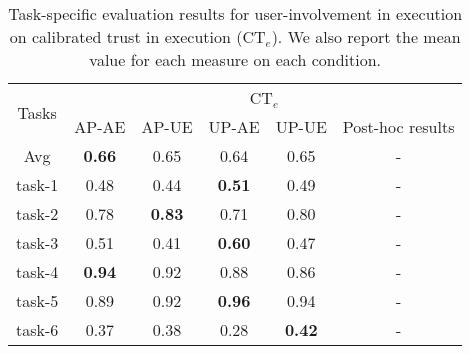 \begin{table}[h]
	\centering
	\caption{Task-specific evaluation results for user-involvement in execution on calibrated trust in execution (CT$_e$). We also report the mean value for each measure on each condition.}%
	\label{tab:h3-res}
    \begin{small}
	\begin{tabular}{c | c c c  c | c }
	    \hline
        \multirow{2}{*}{Tasks}&     \multicolumn{5}{c}{CT$_e$}\\
        \cline{2-6}
        & AP-AE& AP-UE& UP-AE& UP-UE& Post-hoc results\\
        \hline 
        \hline
        Avg & \textbf{0.66} & 0.65 & 0.64 & 0.65 & - \\
        \hline
        task-1& 0.48 & 0.44 & \textbf{0.51} & 0.49 & -\\
        task-2 &0.78 & \textbf{0.83} & 0.71 & 0.80 & -\\
        task-3 & 0.51 & 0.41 & \textbf{0.60} & 0.47 & -\\
        task-4 & \textbf{0.94} & 0.92 & 0.88 & 0.86 & -\\
        task-5 & 0.89 & 0.92 & \textbf{0.96} & 0.94 & -\\
        task-6 & 0.37 & 0.38 & 0.28 & \textbf{0.42} & -\\
    \hline
	\end{tabular}
 \end{small}
\end{table}



